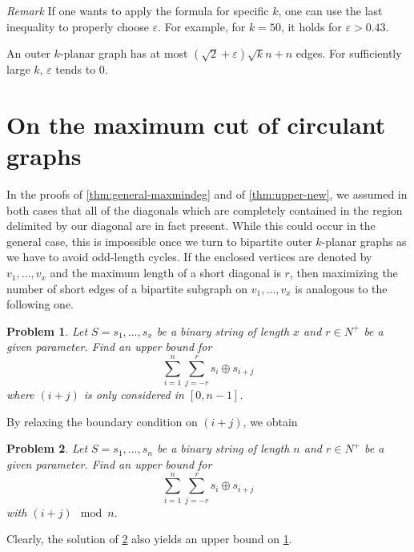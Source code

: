 \documentclass[nolineno,a4paper,USenglish,cleveref,autoref,thm-restate]
{socg}
\newtheorem{problem}{Problem}
\begin{document}
\textit{Remark} If one wants to apply the formula for specific $k$, one can use the last inequality to properly choose $\varepsilon$.
For example, for $k=50$, it holds for $\varepsilon > 0.43$.
\begin{corollary}\label{cor:best-bound}
An outer $k$-planar graph has at most $(\sqrt{2}+\varepsilon)\sqrt{k}n+n$ edges. For sufficiently large $k$, $\varepsilon$ tends to $0$.
\end{corollary}


\section{On the maximum cut of circulant graphs}
\label{sec:circulant_graphs}

In the proofs of \cref{thm:general-maxmindeg} and of \cref{thm:upper-new}, we assumed in both cases that all of the  diagonals which are completely contained in the region delimited by our diagonal are in fact present. While this could occur in the general case, this is impossible once we turn to bipartite outer $k$-planar graphs as we have to avoid odd-length cycles. If the enclosed vertices are denoted by $v_1,\dots,v_x$ and the maximum length of a short diagonal is $r$, then maximizing the number of short edges of a bipartite subgraph on $v_1,\dots,v_x$ is analogous to the following one.
\begin{problem}\label{prob:one}
Let $S = s_1,\dots,s_x$ be a binary string of length $x$ and $r\in N^+$ be a given parameter. Find an upper bound for 
 \[\sum_{i=1}^n \sum_{j=-r}^r s_i \oplus s_{i+j}  \] 
 where $(i+j)$ is only considered in $[0,n-1]$.
 \end{problem}

By relaxing the boundary  condition on  $(i+j)$, we obtain
 \begin{problem}\label{prob:two}
 Let $S = s_1,\dots,s_n$ be a binary string of length $n$ and $r\in N^+$ be a given parameter. Find an upper bound for 
\[\sum_{i=1}^n \sum_{j=-r}^r s_i \oplus s_{i+j}  \] 
 with $(i+j) \mod n$.
 \end{problem}
 Clearly, the solution of \cref{prob:two} also yields an upper bound on \cref{prob:one}.
\end{document}
